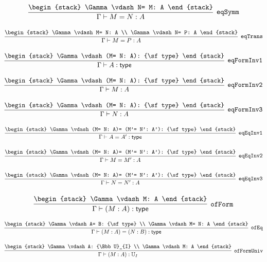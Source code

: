\[
\infer[{\tt eqSymm}]{\Gamma \vdash M= N: A}{
\begin{stack}
\Gamma \vdash N= M: A
\end{stack}}
\]

\[
\infer[{\tt eqTrans}]{\Gamma \vdash M= P: A}{
\begin{stack}
\Gamma \vdash M= N: A
\\
\Gamma \vdash N= P: A
\end{stack}}
\]

\[
\infer[{\tt eqFormInv1}]{\Gamma \vdash A: {\sf type}}{
\begin{stack}
\Gamma \vdash (M= N: A): {\sf type}
\end{stack}}
\]

\[
\infer[{\tt eqFormInv2}]{\Gamma \vdash M: A}{
\begin{stack}
\Gamma \vdash (M= N: A): {\sf type}
\end{stack}}
\]

\[
\infer[{\tt eqFormInv3}]{\Gamma \vdash N: A}{
\begin{stack}
\Gamma \vdash (M= N: A): {\sf type}
\end{stack}}
\]

\[
\infer[{\tt eqEqInv1}]{\Gamma \vdash A= A': {\sf type}}{
\begin{stack}
\Gamma \vdash (M= N: A)= (M'= N': A'): {\sf type}
\end{stack}}
\]

\[
\infer[{\tt eqEqInv2}]{\Gamma \vdash M= M': A}{
\begin{stack}
\Gamma \vdash (M= N: A)= (M'= N': A'): {\sf type}
\end{stack}}
\]

\[
\infer[{\tt eqEqInv3}]{\Gamma \vdash N= N': A}{
\begin{stack}
\Gamma \vdash (M= N: A)= (M'= N': A'): {\sf type}
\end{stack}}
\]

\[
\infer[{\tt ofForm}]{\Gamma \vdash (M: A): {\sf type}}{
\begin{stack}
\Gamma \vdash M: A
\end{stack}}
\]

\[
\infer[{\tt ofEq}]{\Gamma \vdash (M: A)= (N: B): {\sf type}}{
\begin{stack}
\Gamma \vdash A= B: {\sf type}
\\
\Gamma \vdash M= N: A
\end{stack}}
\]

\[
\infer[{\tt ofFormUniv}]{\Gamma \vdash (M: A): {\Bbb U}_{I}}{
\begin{stack}
\Gamma \vdash A: {\Bbb U}_{I}
\\
\Gamma \vdash M: A
\end{stack}}
\]

